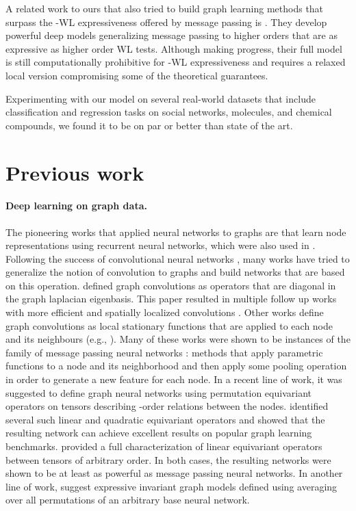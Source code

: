 \documentclass{article}
\newcommand{\eg}{{e.g.}}
\begin{document}
A related work to ours that also tried to build graph learning methods that surpass the -WL expressiveness offered by message passing is \citet{morris2018weisfeiler}. They develop powerful deep models generalizing message passing to higher orders that are as expressive as higher order WL tests. Although making progress, their full model is still computationally prohibitive for -WL expressiveness and requires a relaxed local version compromising some of the theoretical guarantees. 


Experimenting with our model on several real-world datasets that include classification and regression tasks on social networks, molecules, and chemical compounds, we found it to be on par or better than state of the art. 





\section{Previous work}

\paragraph{Deep learning on graph data.}
The pioneering works that applied neural networks to graphs are \cite{Gori2005,Scarselli2009} that learn node representations using recurrent neural networks, which were also used in \cite{Li2015}. Following the success of convolutional neural networks \citep{krizhevsky2012imagenet}, many works have tried to generalize the notion of convolution to graphs and build networks that are based on this operation. \cite{Bruna2013} defined graph convolutions as operators that are diagonal in the graph laplacian eigenbasis. This paper resulted in multiple follow up works with more efficient and spatially localized convolutions \citep{Henaff2015,Defferrard2016,kipf,Levie2017}. Other works define graph convolutions as local stationary functions that are applied to each node and its neighbours (\eg, \cite{Duvenaud2015,Atwood2015,Niepert2016,hamilton2017representation,Velickovic2017,Monti2018}). Many of these works were shown to be instances of the family of message passing neural networks \citep{Gilmer2017}: methods that apply parametric functions to a node and its neighborhood and then apply some pooling operation in order to generate a new feature for each node. 
 In a recent line of work, it was suggested to define graph neural networks using permutation equivariant operators on tensors describing -order relations between the nodes. \cite{Kondor2018} identified several such linear and quadratic equivariant operators and showed that the resulting network can achieve excellent results on popular graph learning benchmarks. \cite{maron2018invariant} provided a full characterization of linear equivariant operators between tensors of arbitrary order. In both cases, the resulting networks were shown to be at least as powerful as message passing neural networks. In another line of work, \cite{murphy2019relational} suggest expressive invariant graph models defined using averaging over all permutations of an arbitrary base neural network.    
\end{document}
